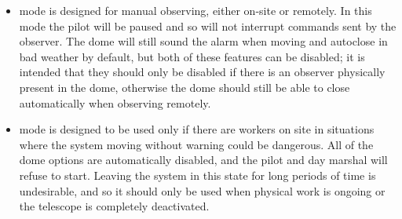 \begin{colsection}
\begin{colsection}
\begin{itemize}
    \item {} mode is designed for manual observing, either on-site or remotely. In this mode the pilot will be paused and so will not interrupt commands sent by the observer. The dome will still sound the alarm when moving and autoclose in bad weather by default, but both of these features can be disabled; it is intended that they should only be disabled if there is an observer physically present in the dome, otherwise the dome should still be able to close automatically when observing remotely.

    \item {} mode is designed to be used only if there are workers on site in situations where the system moving without warning could be dangerous. All of the dome options are automatically disabled, and the pilot and day marshal will refuse to start. Leaving the system in this state for long periods of time is undesirable, and so it should only be used when physical work is ongoing or the telescope is completely deactivated.
\end{itemize}

\end{colsection}


\end{colsection}


\newpage
